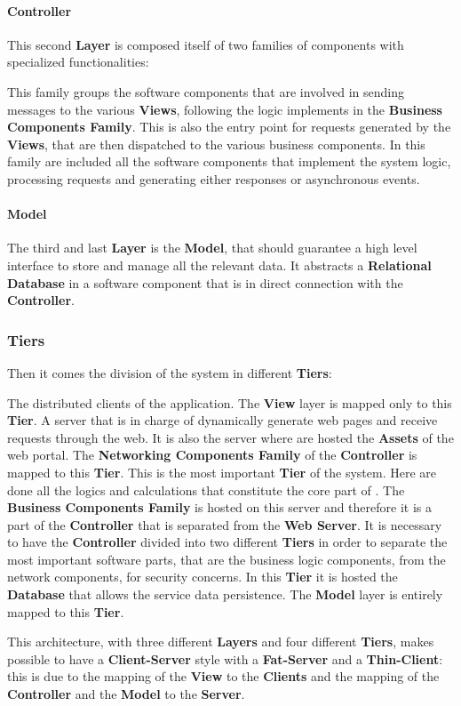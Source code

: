 \paragraph{Controller}
This second \textbf{Layer} is composed itself of two families of components with specialized functionalities:
\begin{itemize}
	 This family groups the software components that are involved in sending messages to the various \textbf{Views}, following the logic implements in the \textbf{Business Components Family}.
	This is also the entry point for requests generated by the \textbf{Views}, that are then dispatched to the various business components.
	 In this family are included all the software components that implement the system logic, processing requests and generating either responses or asynchronous events.
\end{itemize}
%
\paragraph{Model}
The third and last \textbf{Layer} is the \textbf{Model}, that should guarantee a high level interface to store and manage all the \myTaxiService{} relevant data.
It abstracts a \textbf{Relational Database} in a software component that is in direct connection with the \textbf{Controller}.
%
\subsubsection{Tiers}
Then it comes the division of the system in different \textbf{Tiers}:
\begin{itemize}
	 The distributed clients of the application.
		The \textbf{View} layer is mapped only to this \textbf{Tier}.
	 A server that is in charge of dynamically generate web pages and receive requests through the web.
		It is also the server where are hosted the \textbf{Assets} of the web portal.
		The \textbf{Networking Components Family} of the \textbf{Controller} is mapped to this \textbf{Tier}.
	 This is the most important \textbf{Tier} of the system.
		Here are done all the logics and calculations that constitute the core part of \myTaxiService{}.
		The \textbf{Business Components Family} is hosted on this server and therefore it is a part of the \textbf{Controller} that is separated from the \textbf{Web Server}.
		It is necessary to have the \textbf{Controller} divided into two different \textbf{Tiers} in order to separate the most important software parts, that are the business logic components, from the network components, for security concerns.
	 In this \textbf{Tier} it is hosted the \textbf{Database} that allows the service data persistence.
		The \textbf{Model} layer is entirely mapped to this \textbf{Tier}.
\end{itemize}
This architecture, with three different \textbf{Layers} and four different \textbf{Tiers}, makes possible to have a \textbf{Client-Server} style with a \textbf{Fat-Server} and a \textbf{Thin-Client}: this is due to the mapping of the \textbf{View} to the \textbf{Clients} and the mapping of the \textbf{Controller} and the \textbf{Model} to the \textbf{Server}.
%
